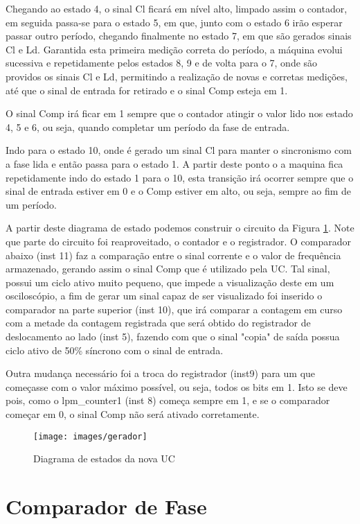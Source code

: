 \documentclass[12pt,a4paper,openany]{abntex2}
\begin{document}
Chegando ao estado 4, o sinal Cl ficará em nível alto, limpado assim o contador, em seguida passa-se para o estado 5, em que, junto com o estado 6 irão esperar passar outro período, chegando finalmente no estado 7, em que são gerados sinais Cl e Ld. Garantida esta primeira medição correta do período, a máquina evolui sucessiva e repetidamente pelos estados 8, 9 e de volta para o 7, onde são providos os sinais Cl e Ld, permitindo a realização de novas e corretas medições, até que o sinal de entrada for retirado e o sinal Comp esteja em 1.

O sinal Comp irá ficar em 1 sempre que o contador atingir o valor lido nos estado 4, 5 e 6, ou seja, quando completar um período da fase de entrada.

Indo para o estado 10, onde é gerado um sinal Cl para manter o sincronismo com a fase lida e então passa para o estado 1. A partir deste ponto o a maquina fica repetidamente indo do estado 1 para o 10, esta transição irá ocorrer sempre que o sinal de entrada estiver em 0 e o Comp estiver em alto, ou seja, sempre ao fim de um período.

A partir deste diagrama de estado podemos construir o circuito da Figura \ref{fig:gerador}. Note que parte do circuito foi reaproveitado, o contador e o registrador. O comparador abaixo (inst 11) faz a comparação entre o sinal corrente e o valor de frequência armazenado, gerando assim o sinal Comp que é utilizado pela UC. Tal sinal, possui um ciclo ativo muito pequeno, que impede a visualização deste em um osciloscópio, a fim de gerar um sinal capaz de ser visualizado foi inserido o comparador na parte superior (inst 10), que irá comparar a contagem em curso com a metade da contagem registrada que será obtido do registrador de deslocamento ao lado (inst 5), fazendo com que o sinal "copia" de saída possua ciclo ativo de 50\% síncrono com o sinal de entrada.

Outra mudança necessário foi a troca do registrador (inst9) para um que começasse com o valor máximo possível, ou seja, todos os bits em 1. Isto se deve pois, como o lpm\_counter1 (inst 8) começa sempre em 1, e se o comparador começar em 0, o sinal Comp não será ativado corretamente.

\begin{figure}[!htp]
	\centering
	\caption{Diagrama de estados da nova UC}
	\texttt{[image: images/gerador]}
	\label{fig:gerador}
\end{figure}

\section{Comparador de Fase}
\end{document}
